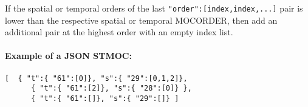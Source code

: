 If the spatial or temporal orders of the last \verb|"order":[index,index,...]| pair is lower than the respective spatial or temporal MOCORDER, then add an additional pair at the highest order with an empty index list.

\paragraph{Example of a JSON STMOC:}
\par\noindent
\begin{lstlisting}[]
   [  { "t":{ "61":[0]}, "s":{ "29":[0,1,2]},
      { "t":{ "61":[2]}, "s":{ "28":[0]} },
      { "t":{ "61":[]}, "s":{ "29":[]} ]
\end{lstlisting}

